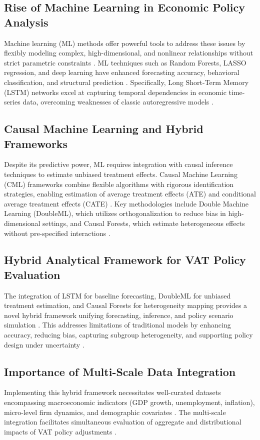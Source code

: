 \documentclass[12pt,a4paper]{article}
\begin{document}
\subsection*{Rise of Machine Learning in Economic Policy Analysis}
Machine learning (ML) methods offer powerful tools to address these issues by flexibly modeling complex, high-dimensional, and nonlinear relationships without strict parametric constraints \citep[section 2.3]{main}. ML techniques such as Random Forests, LASSO regression, and deep learning have enhanced forecasting accuracy, behavioral classification, and structural prediction \citep{bankofcanada2023, sekhansen2023}. Specifically, Long Short-Term Memory (LSTM) networks excel at capturing temporal dependencies in economic time-series data, overcoming weaknesses of classic autoregressive models \citep[sec. 4.3.1]{main}.

\subsection*{Causal Machine Learning and Hybrid Frameworks}
Despite its predictive power, ML requires integration with causal inference techniques to estimate unbiased treatment effects. Causal Machine Learning (CML) frameworks combine flexible algorithms with rigorous identification strategies, enabling estimation of average treatment effects (ATE) and conditional average treatment effects (CATE) \citep[section 2.4]{main}. Key methodologies include Double Machine Learning (DoubleML), which utilizes orthogonalization to reduce bias in high-dimensional settings, and Causal Forests, which estimate heterogeneous effects without pre-specified interactions \citep[sec. 4.2, 4.4]{main}.

\subsection*{Hybrid Analytical Framework for VAT Policy Evaluation}
The integration of LSTM for baseline forecasting, DoubleML for unbiased treatment estimation, and Causal Forests for heterogeneity mapping provides a novel hybrid framework unifying forecasting, inference, and policy scenario simulation \citep[section 2.4.2, 4.1]{main}. This addresses limitations of traditional models by enhancing accuracy, reducing bias, capturing subgroup heterogeneity, and supporting policy design under uncertainty \citep[section 1.3]{main}.

\subsection*{Importance of Multi-Scale Data Integration}
Implementing this hybrid framework necessitates well-curated datasets encompassing macroeconomic indicators (GDP growth, unemployment, inflation), micro-level firm dynamics, and demographic covariates \citep[section 3]{main}. The multi-scale integration facilitates simultaneous evaluation of aggregate and distributional impacts of VAT policy adjustments \citep[section 3.8]{main}.



\end{document}
